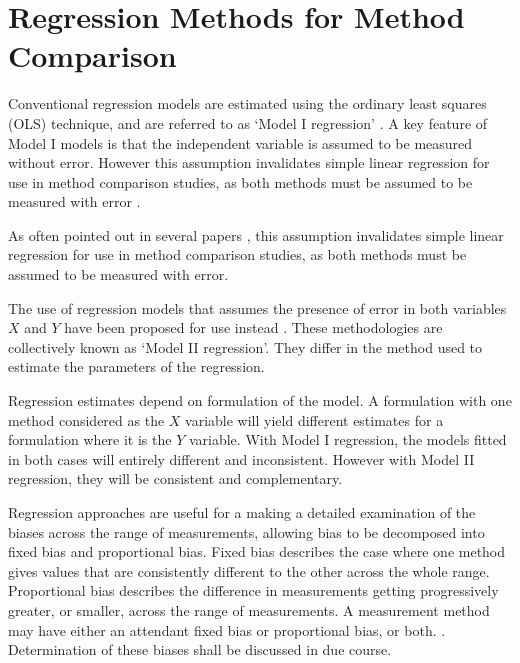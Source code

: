 \documentclass[MAIN.tex]{subfiles}
\begin{document}
	
	\section{Regression Methods for Method Comparison}
	Conventional regression models are estimated using the ordinary
	least squares (OLS) technique, and are referred to as `Model I
	regression' \citep{CornCoch,ludbrook97}. A key feature of Model I
	models is that the independent variable is assumed to be measured
	without error. However this assumption invalidates simple linear
	regression for use in method comparison studies, as both methods
	must be assumed to be measured with error \citep{BA83,ludbrook97}.
	
	As often pointed out in several papers
	\citep{BA83,ludbrook97}, this assumption invalidates simple linear regression for use in method comparison studies, as both methods must be assumed to be measured with error.
	
	
	
	The use of regression models that assumes the presence of error in both variables $X$ and $Y$ have been proposed for use instead
	\citep{CornCoch,ludbrook97}. These methodologies are collectively known as `Model II regression'. They differ in the method used to
	estimate the parameters of the regression.
	
	Regression estimates depend on formulation of the model. A formulation with one method considered as the $X$ variable will yield different estimates for a formulation where it is the $Y$
	variable. With Model I regression, the models fitted in both cases will entirely different and inconsistent. However with Model II
	regression, they will be consistent and complementary.
	
	Regression approaches are useful for a making a detailed examination of the biases across the range of measurements, allowing bias to be decomposed into fixed bias and proportional bias.
	Fixed bias describes the case where one method gives values that are consistently different to the other across the whole range. Proportional
	bias describes the difference in measurements getting progressively greater, or smaller, across the range of measurements. A measurement method may have either an attendant fixed bias or proportional bias, or both. \citep{ludbrook97}. Determination of these biases shall be discussed in due course.
\end{document}
